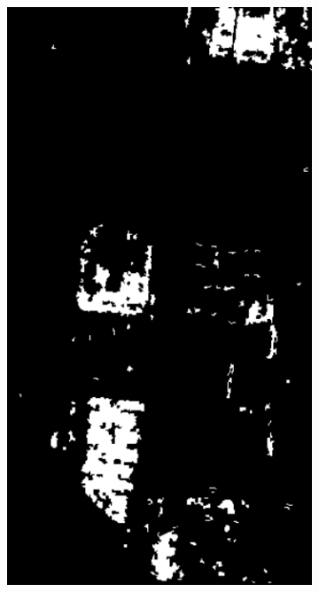 \begin{figure}[t]
\begin{subfigure}[b]{0.2\columnwidth}
		\includegraphics[width=\textwidth]{Figures/CD/OP_1_A2}
		\caption{}
		\label{fig:3_c}
\end{subfigure}


\end{figure}
